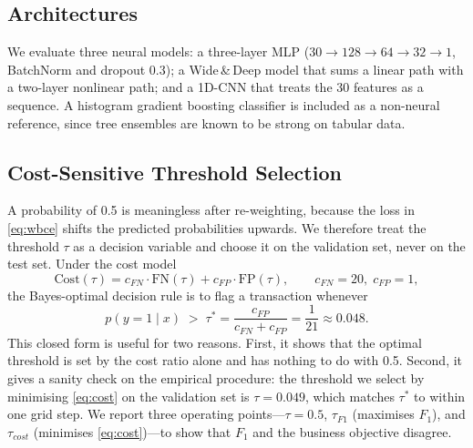 \documentclass[conference]{IEEEtran}
\begin{document}
\subsection{Architectures}
We evaluate three neural models: a three-layer MLP
($30\!\to\!128\!\to\!64\!\to\!32\!\to\!1$, BatchNorm and dropout $0.3$);
a Wide\,\&\,Deep model that sums a linear path with a two-layer nonlinear path;
and a 1D-CNN that treats the 30 features as a sequence. A histogram gradient
boosting classifier is included as a non-neural reference, since tree ensembles
are known to be strong on tabular data.

\subsection{Cost-Sensitive Threshold Selection}
A probability of 0.5 is meaningless after re-weighting, because the loss in
\eqref{eq:wbce} shifts the predicted probabilities upwards. We therefore treat
the threshold $\tau$ as a decision variable and choose it on the validation
set, never on the test set. Under the cost model
\begin{equation}
  \mathrm{Cost}(\tau) = c_{FN}\cdot \mathrm{FN}(\tau) + c_{FP}\cdot \mathrm{FP}(\tau),
  \qquad c_{FN}=20,\; c_{FP}=1,
  \label{eq:cost}
\end{equation}
the Bayes-optimal decision rule is to flag a transaction whenever
\begin{equation}
  p(y{=}1\mid x) \;>\; \tau^{*} = \frac{c_{FP}}{c_{FN}+c_{FP}} = \frac{1}{21} \approx 0.048 .
  \label{eq:taustar}
\end{equation}
This closed form is useful for two reasons. First, it shows that the optimal
threshold is set by the cost ratio alone and has nothing to do with 0.5.
Second, it gives a sanity check on the empirical procedure: the threshold we
select by minimising \eqref{eq:cost} on the validation set is
$\tau=0.049$, which matches $\tau^{*}$ to within one grid step.
We report three operating points---$\tau{=}0.5$, $\tau_{F1}$ (maximises
$F_1$), and $\tau_{cost}$ (minimises \eqref{eq:cost})---to show that $F_1$
and the business objective disagree.
\end{document}
